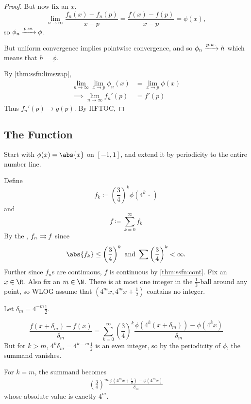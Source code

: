 \begin{proof}
    But now fix an $x$. \[
        \lim_{n \to \infty} \frac{f_n(x) - f_n(p)}{x - p}
            = \frac{f(x) - f(p)}{x - p} = \phi(x),
    \] so $\phi_n \xrightarrow{p.w.} \phi$.

    But uniform convergence implies pointwise convergence, and so
    $\phi_n \xrightarrow{p.w.} h$ which means that $h = \phi$.

    By \cref{thm:ssfn:limswap}, \begin{align*}
        \lim_{n \to \infty} \lim_{x \to p} \phi_n(x)
        &= \lim_{x \to p} \phi(x) \\
        \implies \lim_{n \to \infty} f_n'(p) &= f'(p)
    \end{align*}
    Thus $f_n'(p) \to g(p)$.
    By IIFTOC, %
\end{proof}

\subsection{The Function} \label{sec:thefn}

Start with $\phi(x) = \abs{x}$ on $[-1, 1]$, and extend it by periodicity
to the entire number line.

Define \[
    f_k \coloneq \left(\frac{3}{4}\right)^k \phi(4^k \,\cdot\,)
\] and \[
    f \coloneq \sum_{k=0}^{\infty} f_k
\]
By the , $f_n \rightrightarrows f$ since \[
    \abs{f_k} \le \left(\frac{3}{4}\right)^k
        \text{ and }
    \sum \left(\frac34\right)^k < \infty.
\] Further since $f_n$s are continuous, $f$ is continuous by
\cref{thm:ssfn:cont}.
Fix an $x \in \R$.
Also fix an $m \in \N$.
There is at most one integer in the $\frac12$-ball around any point, so WLOG
assume that $(4^m x, 4^m x + \frac12)$ contains no integer.

Let $\delta_m = 4^{-m} \frac12$.

\[
    \frac{f(x + \delta_m) - f(x)}{\delta_m}
    = \sum_{k=0}^\infty \left(\frac{3}{4}\right)^k
        \frac{\phi(4^k (x + \delta_m)) - \phi(4^k x)}{\delta_m}
\]
But for $k > m$, $4^k \delta_m = 4^{k-m} \frac{1}{2}$ is an even integer,
so by the periodicity of $\phi$, the summand vanishes.

For $k = m$, the summand becomes \begin{align*}
    \left(\frac{3}{4}\right)^m \frac{\phi(4^m x + \frac12) - \phi(4^m x)}{\delta_m}
\end{align*}
whose absolute value is exactly $4^m$.
